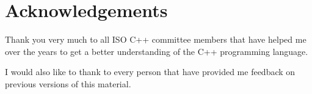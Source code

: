 \chapter*{Acknowledgements}

Thank you very much to all ISO C++ committee members that have helped
me over the years to get a better understanding of the C++ programming
language.

I would also like to thank to every person that have provided me feedback
on previous versions of this material.
